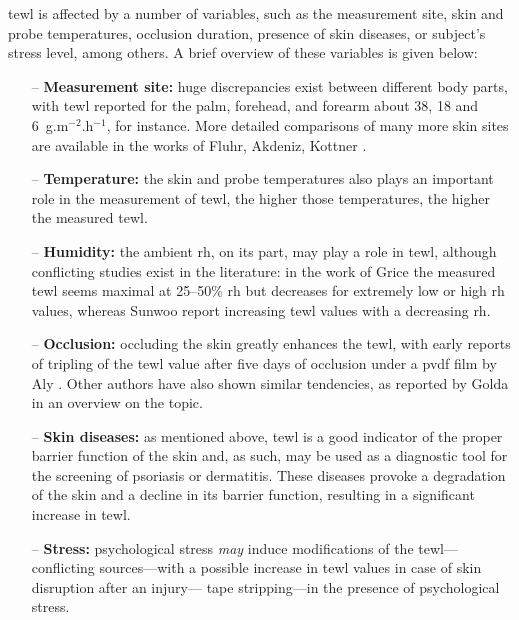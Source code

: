 \gls{tewl} is affected by a number of variables, such as the measurement site, skin and probe temperatures, occlusion duration, presence of skin diseases, or subject's stress level, among others\cite[pp.~63--76]{fluhr2004bioengineering}\cite{aly1978, rogiers2001, li2015, schmuth2020}. A brief overview of these variables is given below:

\begin{itemize}
	\item[--] \textbf{Measurement site:} huge discrepancies exist between different body parts, with \gls{tewl} reported for the palm, forehead, and forearm about 38, 18 and 6~g.m$^{-2}$.h$^{-1}$\cite{rogiers1995}, for instance. More detailed comparisons of many more skin sites are available in the works of Fluhr, Akdeniz, Kottner \etal{}\cite{fluhr2004bioengineering, kottner2013, akdeniz2018}.
	\item[--] \textbf{Temperature:} the skin and probe temperatures also plays an important role in the measurement of \gls{tewl}, the higher those temperatures, the higher the measured \gls{tewl}\cite{mathias1981, rogiers1995, cravello2008}.
	\item[--] \textbf{Humidity:} the ambient \gls{rh}, on its part, may play a role in \gls{tewl}, although conflicting studies exist in the literature: in the work of Grice \etal{}\cite{grice1972} the measured \gls{tewl} seems maximal at 25--50\% \gls{rh} but decreases for extremely low or high \gls{rh} values, whereas Sunwoo \etal{}\cite{sunwoo2006} report increasing \gls{tewl} values with a decreasing \gls{rh}.
	\item[--] \textbf{Occlusion:} occluding the skin greatly enhances the \gls{tewl}, with early reports of tripling of the \gls{tewl} value after five days of occlusion under a \gls{pvdf} film by Aly \etal{}\cite{aly1978}. Other authors have also shown similar tendencies, as reported by Golda \etal{}\cite{golda2005} in an overview on the topic.
	\item[--] \textbf{Skin diseases:} as mentioned above, \gls{tewl} is a good indicator of the proper barrier function of the skin and, as such, may be used as a diagnostic tool for the screening of psoriasis or dermatitis\cite{laudaska2003, montero2021}. These diseases provoke a degradation of the skin and a decline in its barrier function, resulting in a significant increase in \gls{tewl}.
	\item[--] \textbf{Stress:} psychological stress \emph{may} induce modifications of the \gls{tewl}---conflicting sources---with a possible increase in \gls{tewl} values in case of skin disruption after an injury---\ie{} tape stripping---in the presence of psychological stress\cite{altemus2001, muizzuddin2003}. %
\end{itemize}

